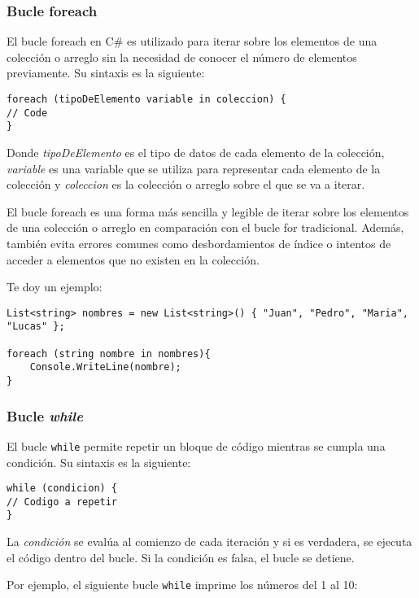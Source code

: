 \documentclass[executivepaper]{article}
\begin{document}
\subsubsection*{Bucle foreach}

El bucle foreach en C\# es utilizado para iterar sobre los elementos de una colección o arreglo sin la necesidad de conocer el número de elementos previamente. Su sintaxis es la siguiente:

\begin{lstlisting}
foreach (tipoDeElemento variable in coleccion) {
// Code
}
\end{lstlisting}

Donde \emph{tipoDeElemento} es el tipo de datos de cada elemento de la colección, \emph{variable} es una variable que se utiliza para representar cada elemento de la colección y \emph{coleccion} es la colección o arreglo sobre el que se va a iterar.

El bucle foreach es una forma más sencilla y legible de iterar sobre los elementos de una colección o arreglo en comparación con el bucle for tradicional. Además, también evita errores comunes como desbordamientos de índice o intentos de acceder a elementos que no existen en la colección.

Te doy un ejemplo:
\begin{lstlisting}[language={[Sharp]C}]
List<string> nombres = new List<string>() { "Juan", "Pedro", "Maria", "Lucas" };

foreach (string nombre in nombres){
    Console.WriteLine(nombre);
}
\end{lstlisting}

\subsubsection*{Bucle \emph{while}}

El bucle \verb|while| permite repetir un bloque de código mientras se cumpla una condición. Su sintaxis es la siguiente:

\begin{lstlisting}
while (condicion) {
// Codigo a repetir
}
\end{lstlisting}

La \emph{condición} se evalúa al comienzo de cada iteración y si es verdadera, se ejecuta el código dentro del bucle. Si la condición es falsa, el bucle se detiene.

Por ejemplo, el siguiente bucle \verb|while| imprime los números del 1 al 10:
\end{document}

